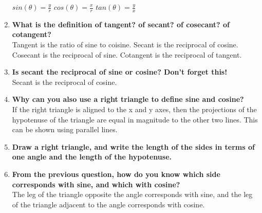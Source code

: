 \begin{enumerate}
\begin{figure}[htb!]
\begin{tikzpicture}[inner sep=0pt,minimum size=0mm]
\end{tikzpicture}
\end{figure}

\tab$sin(\theta) = \frac{y}{r}$ \tab$cos(\theta) = \frac{x}{r}$ \tab$tan(\theta) = \frac{y}{x}$\\


\item{{\bf What is the definition of tangent?  of secant?  of cosecant?  of cotangent?}\\
{Tangent is the ratio of sine to coisine.  Secant is the reciprocal of cosine.  Cosecant is the reciprocal of sine.  Cotangent is the reciprocal of tangent.}}

\item{{\bf Is secant the reciprocal of sine or cosine?  Don't forget this!}\\
{Secant is the reciprocal of cosine.}}

\item{{\bf Why can you also use a right triangle to define sine and cosine?}\\
{If the right triangle is aligned to the x and y axes, then the projections of the hypotenuse of the triangle are equal in magnitude to the other two lines.  This can be shown using parallel lines.}}

\item{{\bf Draw a right triangle, and write the length of the sides in terms of one angle and the length of the hypotenuse.}\\
{}}

\begin{figure}[htb!]
\center
\label{fig:projection_onto_axes}
\end{figure}

\item{{\bf From the previous question, how do you know which side corresponds with sine, and which with cosine?}\\
{The leg of the triangle opposite the angle corresponds with sine, and the leg of the triangle adjacent to the angle corresponds with cosine.}}

\end{enumerate}







